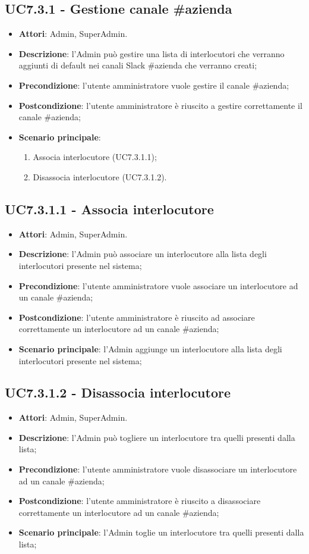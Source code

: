 \documentclass[../AnalisiDeiRequisiti_v4.0.0.tex]{subfiles}
\begin{document}
\subsection{UC7.3.1 - Gestione canale \#azienda} 
\label{sssec:UC7.3.1} 
\begin{itemize} 
\item \textbf{Attori}: Admin, SuperAdmin.
\item \textbf{Descrizione}: l'Admin può gestire una lista di interlocutori che verranno aggiunti di default nei canali Slack \#azienda che verranno creati;
\item \textbf{Precondizione}: l'utente amministratore vuole gestire il canale \#azienda;
\item \textbf{Postcondizione}: l'utente amministratore è riuscito a gestire correttamente il canale \#azienda;
\item \textbf{Scenario principale}: \begin{enumerate}\item Associa interlocutore (UC7.3.1.1);\item Disassocia interlocutore (UC7.3.1.2). 
 \end{enumerate}
\end{itemize} 
\subsection{UC7.3.1.1 - Associa interlocutore} 
\label{sssec:UC7.3.1.1} 
\begin{itemize} 
\item \textbf{Attori}: Admin, SuperAdmin.
\item \textbf{Descrizione}: l'Admin può associare un interlocutore alla lista degli interlocutori presente nel sistema;
\item \textbf{Precondizione}: l'utente amministratore vuole associare un interlocutore ad un canale \#azienda;
\item \textbf{Postcondizione}: l'utente amministratore è riuscito ad associare correttamente un interlocutore ad un canale \#azienda;
\item \textbf{Scenario principale}: l'Admin aggiunge un interlocutore alla lista degli interlocutori presente nel sistema;
\end{itemize} 
\subsection{UC7.3.1.2 - Disassocia interlocutore} 
\label{sssec:UC7.3.1.2} 
\begin{itemize} 
\item \textbf{Attori}: Admin, SuperAdmin.
\item \textbf{Descrizione}: l'Admin può togliere un interlocutore tra quelli presenti dalla lista;
\item \textbf{Precondizione}: l'utente amministratore vuole disassociare un interlocutore ad un canale \#azienda;
\item \textbf{Postcondizione}: l'utente amministratore è riuscito a disassociare correttamente un interlocutore ad un canale \#azienda;
\item \textbf{Scenario principale}: l'Admin toglie un interlocutore tra quelli presenti dalla lista;
\end{itemize} 
\end{document}
